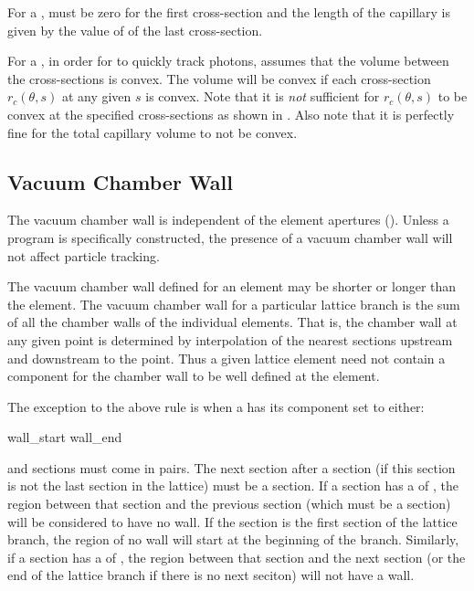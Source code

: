 For a ,  must be zero for the first cross-section and
the length of the capillary is given by the value of  of the
last cross-section.

For a , in order for \bmad to quickly track photons,
\bmad assumes that the volume between the cross-sections is
convex. The volume will be convex if each cross-section $r_c(\theta,
s)$ at any given $s$ is convex. Note that it is {\em not} sufficient
for $r_c(\theta, s)$ to be convex at the specified cross-sections as
shown in . Also note that it is perfectly
fine for the total capillary volume to not be convex.

\subsection{Vacuum Chamber Wall}
\label{s:wall.vacuum}

The vacuum chamber wall is independent of the element apertures
(). Unless a program is specifically constructed, the
presence of a vacuum chamber wall will not affect particle tracking.

The vacuum chamber wall defined for an element may be shorter or
longer than the element.  The vacuum chamber wall for a particular
lattice branch is the sum of all the chamber walls of the individual
elements. That is, the chamber wall at any given point is determined
by interpolation of the nearest sections upstream and downstream to
the point.  Thus a given lattice element need not contain a 
component for the chamber wall to be well defined at the element. 

The exception to the above rule is when a  has its
 component set to either:
\begin{example}
  wall_start
  wall_end
\end{example}
 and  sections must come in pairs. The
next section after a  section (if this section is not
the last section in the lattice) must be a  section.
If a section has a  of , the region between
that section and the previous section (which must be a 
section) will be considered to have no wall. If the 
section is the first section of the lattice branch, the region of no
wall will start at the beginning of the branch. Similarly, if a
section has a  of , the region between that
section and the next section (or the end of the lattice branch if
there is no next seciton) will not have a wall.

